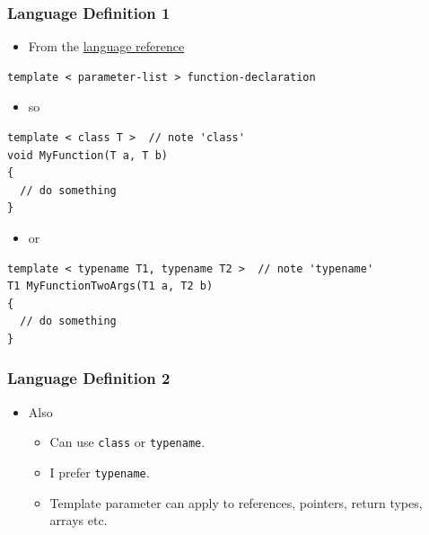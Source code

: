 \subsubsection{Language Definition 1}\label{language-definition-1}

\begin{itemize}
\itemsep1pt\parskip0pt
\item
  From the
  \href{http://en.cppreference.com/w/cpp/language/function_template}{language
  reference}
\end{itemize}

\begin{verbatim}
template < parameter-list > function-declaration
\end{verbatim}

\begin{itemize}
\itemsep1pt\parskip0pt
\item
  so
\end{itemize}

\begin{verbatim}
template < class T >  // note 'class'
void MyFunction(T a, T b)
{
  // do something
}
\end{verbatim}

\begin{itemize}
\itemsep1pt\parskip0pt
\item
  or
\end{itemize}

\begin{verbatim}
template < typename T1, typename T2 >  // note 'typename'
T1 MyFunctionTwoArgs(T1 a, T2 b)
{
  // do something
}
\end{verbatim}

\subsubsection{Language Definition 2}\label{language-definition-2}

\begin{itemize}
\itemsep1pt\parskip0pt
\item
  Also

  \begin{itemize}
  \itemsep1pt\parskip0pt
  \item
    Can use \texttt{class} or \texttt{typename}.
  \item
    I prefer \texttt{typename}.
  \item
    Template parameter can apply to references, pointers, return types,
    arrays etc.
  \end{itemize}
\end{itemize}

